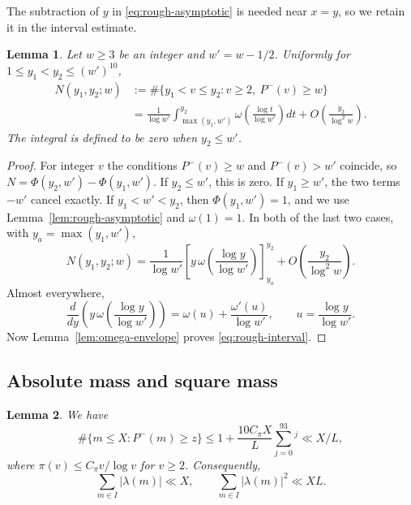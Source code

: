 \documentclass{amsart}
\newtheorem{lemma}{Lemma}[section]
\numberwithin{equation}{section}
\numberwithin{table}{section}
\begin{document}
The subtraction of $y$ in \eqref{eq:rough-asymptotic} is needed near
$x=y$, so we retain it in the interval estimate.

\begin{lemma}\label{lem:rough-interval}
Let $w\ge3$ be an integer and $w'=w-1/2$.
Uniformly for $1\le y_1<y_2\le(w')^{10}$,
\begin{equation}\label{eq:rough-interval}
\begin{split}
N(y_1,y_2;w)
&:=\#\{y_1<v\le y_2:v\ge2,\ P^-(v)\ge w\}\\
&=\frac1{\log w'}\int_{\max(y_1,w')}^{y_2}
\omega\left(\frac{\log t}{\log w'}\right)dt
+O\left(\frac{y_2}{\log^2w}\right).
\end{split}
\end{equation}
The integral is defined to be zero when $y_2\le w'$.
\end{lemma}

\begin{proof}
For integer $v$ the conditions $P^-(v)\ge w$ and $P^-(v)>w'$ coincide,
so $N=\Phi(y_2,w')-\Phi(y_1,w')$. If $y_2\le w'$, this is zero.
If $y_1\ge w'$, the two terms $-w'$ cancel exactly.
If $y_1<w'<y_2$, then $\Phi(y_1,w')=1$, and we use
Lemma~\ref{lem:rough-asymptotic} and $\omega(1)=1$.
In both of the last two cases, with $y_a=\max(y_1,w')$,
\[
N(y_1,y_2;w)
=\frac1{\log w'}
\left[y\,\omega\left(\frac{\log y}{\log w'}\right)\right]_{y_a}^{y_2}
+O\left(\frac{y_2}{\log^2w}\right).
\]
Almost everywhere,
\[
\frac{d}{dy}\left(y\,\omega\left(\frac{\log y}{\log w'}\right)\right)
=\omega(u)+\frac{\omega'(u)}{\log w'},
\qquad u=\frac{\log y}{\log w'}.
\]
Now Lemma~\ref{lem:omega-envelope} proves \eqref{eq:rough-interval}.
\end{proof}

\subsection{Absolute mass and square mass}

\begin{lemma}\label{lem:weight-norms}
We have
\begin{equation}\label{eq:rough-support}
\#\{m\le X:P^-(m)\ge z\}
\le1+\frac{10C_\pi X}{L}\sum_{j=0}^93^j\ll X/L,
\end{equation}
where $\pi(v)\le C_\pi v/\log v$ for $v\ge2$.
Consequently,
\begin{equation}\label{eq:weight-norms}
\sum_{m\in I}|\lambda(m)|\ll X,
\qquad \sum_{m\in I}|\lambda(m)|^2\ll XL.
\end{equation}
\end{lemma}
\end{document}
